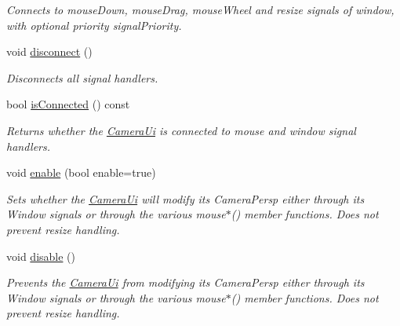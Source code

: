\begin{DoxyCompactItemize}
\begin{DoxyCompactList}\small\item\em Connects to mouse\+Down, mouse\+Drag, mouse\+Wheel and resize signals of {\itshape window}, with optional priority {\itshape signal\+Priority}. \end{DoxyCompactList}\item 
\mbox{\label{classpepr3d_1_1_camera_ui_a4f9366d1c5961a86329eb87742cc285e}} 
void \mbox{\hyperlink{classpepr3d_1_1_camera_ui_a4f9366d1c5961a86329eb87742cc285e}{disconnect}} ()
\begin{DoxyCompactList}\small\item\em Disconnects all signal handlers. \end{DoxyCompactList}\item 
\mbox{\label{classpepr3d_1_1_camera_ui_a5b7750464d56c67303ad2f1ea62b6058}} 
bool \mbox{\hyperlink{classpepr3d_1_1_camera_ui_a5b7750464d56c67303ad2f1ea62b6058}{is\+Connected}} () const
\begin{DoxyCompactList}\small\item\em Returns whether the \mbox{\hyperlink{classpepr3d_1_1_camera_ui}{Camera\+Ui}} is connected to mouse and window signal handlers. \end{DoxyCompactList}\item 
\mbox{\label{classpepr3d_1_1_camera_ui_a4c4ec9d00391cb7dbe1cce0fcc0972f2}} 
void \mbox{\hyperlink{classpepr3d_1_1_camera_ui_a4c4ec9d00391cb7dbe1cce0fcc0972f2}{enable}} (bool enable=true)
\begin{DoxyCompactList}\small\item\em Sets whether the \mbox{\hyperlink{classpepr3d_1_1_camera_ui}{Camera\+Ui}} will modify its Camera\+Persp either through its Window signals or through the various mouse$\ast$() member functions. Does not prevent resize handling. \end{DoxyCompactList}\item 
\mbox{\label{classpepr3d_1_1_camera_ui_a0f33d7c28919fceeb71dce9a7dcfea3b}} 
void \mbox{\hyperlink{classpepr3d_1_1_camera_ui_a0f33d7c28919fceeb71dce9a7dcfea3b}{disable}} ()
\begin{DoxyCompactList}\small\item\em Prevents the \mbox{\hyperlink{classpepr3d_1_1_camera_ui}{Camera\+Ui}} from modifying its Camera\+Persp either through its Window signals or through the various mouse$\ast$() member functions. Does not prevent resize handling. \end{DoxyCompactList}\item 

\end{DoxyCompactItemize}
